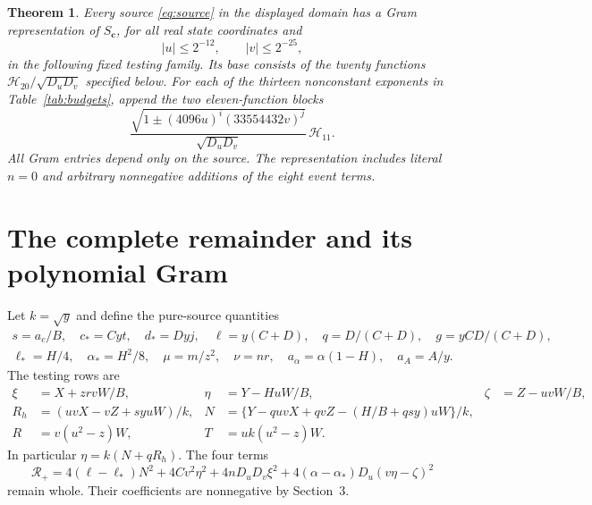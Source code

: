 \documentclass[10pt]{article}
\newtheorem{theorem}{Theorem}
\newcommand{\Du}{D_u}
\newcommand{\Dv}{D_v}
\begin{document}
\begin{theorem}\label{thm:strong}
Every source \eqref{eq:source} in the displayed domain has a Gram
representation of \(S_{\mathbf c}\), for all real state coordinates and
\[
 |u|\le2^{-12},\qquad |v|\le2^{-25},
\]
in the following fixed testing family. Its base consists of the twenty
functions \(\mathcal H_{20}/\sqrt{\Du\Dv}\) specified below. For each of the
thirteen nonconstant exponents in Table~\ref{tab:budgets}, append the two
eleven-function blocks
\[
 \frac{\sqrt{1\pm(4096u)^i(33554432v)^j}}{\sqrt{\Du\Dv}}\,
 \mathcal H_{11}.
\]
All Gram entries depend only on the source. The representation includes
literal \(n=0\) and arbitrary nonnegative additions of the eight event
terms.
\end{theorem}

\section{The complete remainder and its polynomial Gram}

Let \(k=\sqrt y\) and define the pure-source quantities
\begin{equation}
\begin{gathered}
 s=a_c/B,\quad c_*=Cyt,\quad d_*=Dyj,\quad
 \ell=y(C+D),\quad q=D/(C+D),\quad g=yCD/(C+D),\\
 \ell_*=H/4,\quad \alpha_*=H^2/8,\quad
 \mu=m/z^2,\quad \nu=nr,\quad a_\alpha=\alpha(1-H),\quad a_A=A/y .
\end{gathered}\label{eq:scaledsource}
\end{equation}
The testing rows are
\begin{align}
 \xi&=X+zrvW/B,& \eta&=Y-HuW/B,& \zeta&=Z-uvW/B,\nonumber\\
 R_h&=(uvX-vZ+syuW)/k,&
 N&=\{Y-quvX+qvZ-(H/B+qsy)uW\}/k,\nonumber\\
 R&=v(u^2-z)W,& T&=uk(u^2-z)W.                     \label{eq:rows}
\end{align}
In particular \(\eta=k(N+qR_h)\).
The four terms
\begin{equation}
 \mathcal R_+=4(\ell-\ell_*)N^2+4Cv^2\eta^2
       +4n\Du\Dv\xi^2+4(\alpha-\alpha_*)\Du(v\eta-\zeta)^2
                                                               \label{eq:retained}
\end{equation}
remain whole. Their coefficients are nonnegative by Section~3.
\end{document}
